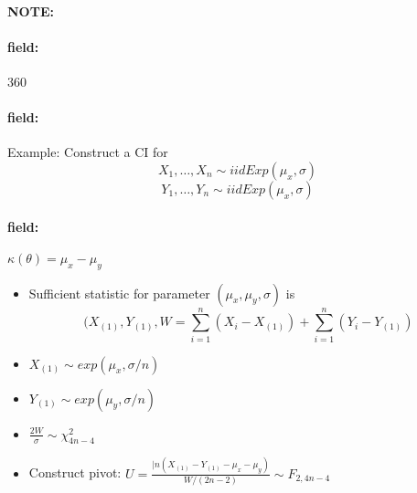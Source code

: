\documentclass[12pt]{article}
\newenvironment{note}{\paragraph{NOTE:}}{}
\newenvironment{field}{\paragraph{field:}}{}
\begin{document}
\begin{note}
    \begin{field}
        \tiny 360
    \end{field}
    \begin{field}
        Example: Construct a CI for $$ X_1, \ldots , X_n \sim iid Exp(\mu_x,\sigma)$$ $$Y_1, \ldots , Y_n \sim iid Exp(\mu_x,\sigma)$$


    \end{field}
    \begin{field}
        $\kappa(\theta) = \mu_x - \mu_y$
        \begin{itemize}
          \item Sufficient statistic for parameter $(\mu_x,\mu_y,\sigma)$ is
          $$(X_{(1)}, Y_{(1)}, W = \sum_{i=1}^n (X_i - X_{(1)}) + \sum_{i=1}^n (Y_i - Y_{(1)}) $$
          \item $X_{(1)} \sim exp(\mu_x, \sigma/n)$
          \item $Y_{(1)} \sim exp(\mu_y, \sigma/n)$
          \item $\frac{2W}{\sigma} \sim \chi^2_{4n-4}$
          \item Construct pivot: $U = \frac{|n(X_{(1)} - Y_{(1)} - \mu_x - \mu_y)}{W/(2n-2)} \sim F_{2,4n-4}$
        \end{itemize}
    \end{field}
\end{note}
\end{document}
